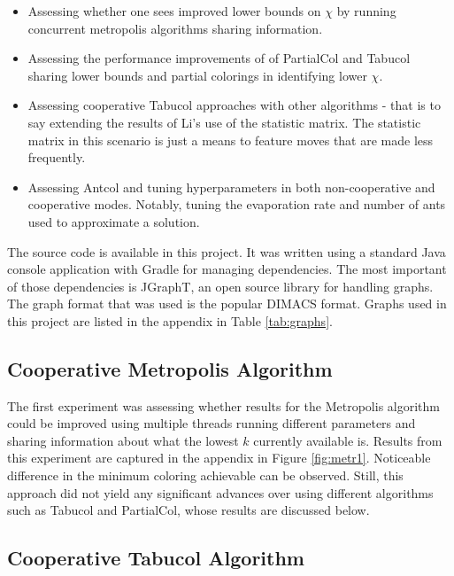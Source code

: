 \documentclass[runningheads]{llncs}
\begin{document}
\begin{itemize}

  \item Assessing whether one sees improved lower bounds on $\chi$ by running concurrent metropolis algorithms sharing information.
  \item Assessing the performance improvements of of PartialCol and Tabucol sharing lower bounds and partial colorings in identifying lower $\chi$.
  \item Assessing cooperative Tabucol approaches with other algorithms - that is to say extending the results of Li's use of the statistic matrix. \cite{https://doi.org/10.5445/ir/1000083192} The statistic matrix in this scenario is just a means to feature moves that are made less frequently.
  \item Assessing Antcol and tuning hyperparameters in both non-cooperative and cooperative modes. Notably, tuning the evaporation rate and number of ants used to approximate a solution.
\end{itemize}

The source code is available in this project. It was written using a standard Java console application with Gradle for managing dependencies. The most important of those dependencies is JGraphT, an open source library for handling graphs. The graph format that was used is the popular DIMACS format. Graphs used in this project are listed in the appendix in Table \ref{tab:graphs}.

\subsection{Cooperative Metropolis Algorithm}

The first experiment was assessing whether results for the Metropolis algorithm could be improved using multiple threads running different parameters and sharing information about what the lowest $k$ currently available is. Results from this experiment are captured in the appendix in Figure \ref{fig:metr1}. Noticeable difference in the minimum coloring achievable can be observed. Still, this approach did not yield any significant advances over using different algorithms such as Tabucol and PartialCol, whose results are discussed below.

\subsection{Cooperative Tabucol Algorithm}
\end{document}
